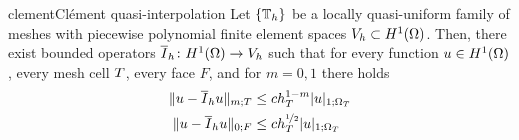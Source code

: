 \begin{Theorem*}{clement}{Clément quasi-interpolation}
  Let $\{\mathbb T_h\}$ be a locally quasi-uniform family of meshes with
  piecewise polynomial finite element spaces
  $V_h\subset H^1(\Omega)$. Then, there exist bounded operators
  $\overline I_h\colon H^1(\Omega) \to V_h$ such that for every
  function $u\in H^1(\Omega)$, every mesh cell $T$, every face
  $F$, and for $m=0,1$ there holds
  \begin{align}
    \lVert u-\overline I_h u\rVert_{m;T} &\le c h_T^{1-m} \lvert u\rvert_{1;\Omega_T} \\
    \lVert u-\overline I_h u\rVert_{0;F} &\le c h_T^{\nicefrac{1}{2}} \lvert u\rvert_{1;\Omega_T}
  \end{align}
\end{Theorem*}


